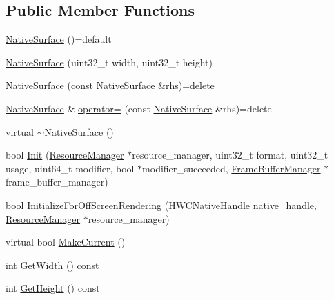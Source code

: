 \subsection*{Public Member Functions}
\begin{DoxyCompactItemize}
\item 
\mbox{\hyperlink{classhwcomposer_1_1NativeSurface_a17e5ae7ecfd166faa21ccba1e6b03197}{Native\+Surface}} ()=default
\item 
\mbox{\hyperlink{classhwcomposer_1_1NativeSurface_a9027ed717fedb2d2f99bc42c6bb82b70}{Native\+Surface}} (uint32\+\_\+t width, uint32\+\_\+t height)
\item 
\mbox{\hyperlink{classhwcomposer_1_1NativeSurface_a92d9adc1ade0f86e5a37a55658e2fbaa}{Native\+Surface}} (const \mbox{\hyperlink{classhwcomposer_1_1NativeSurface}{Native\+Surface}} \&rhs)=delete
\item 
\mbox{\hyperlink{classhwcomposer_1_1NativeSurface}{Native\+Surface}} \& \mbox{\hyperlink{classhwcomposer_1_1NativeSurface_ad293b1c21e9bc452744cde6595227433}{operator=}} (const \mbox{\hyperlink{classhwcomposer_1_1NativeSurface}{Native\+Surface}} \&rhs)=delete
\item 
virtual \mbox{\hyperlink{classhwcomposer_1_1NativeSurface_aedd0dc3037e1291937656921c97dd1a6}{$\sim$\+Native\+Surface}} ()
\item 
bool \mbox{\hyperlink{classhwcomposer_1_1NativeSurface_a6e70cd7f3a013619235dd05934c33930}{Init}} (\mbox{\hyperlink{classhwcomposer_1_1ResourceManager}{Resource\+Manager}} $\ast$resource\+\_\+manager, uint32\+\_\+t format, uint32\+\_\+t usage, uint64\+\_\+t modifier, bool $\ast$modifier\+\_\+succeeded, \mbox{\hyperlink{classhwcomposer_1_1FrameBufferManager}{Frame\+Buffer\+Manager}} $\ast$frame\+\_\+buffer\+\_\+manager)
\item 
bool \mbox{\hyperlink{classhwcomposer_1_1NativeSurface_a1fcece06f9889170f33b3b6a028e149e}{Initialize\+For\+Off\+Screen\+Rendering}} (\mbox{\hyperlink{alios_2platformdefines_8h_ac0a2eaf260f556d17fe489911f017bdf}{H\+W\+C\+Native\+Handle}} native\+\_\+handle, \mbox{\hyperlink{classhwcomposer_1_1ResourceManager}{Resource\+Manager}} $\ast$resource\+\_\+manager)
\item 
virtual bool \mbox{\hyperlink{classhwcomposer_1_1NativeSurface_a2e3bdea36f4b2d3f655a5f6d38670d51}{Make\+Current}} ()
\item 
int \mbox{\hyperlink{classhwcomposer_1_1NativeSurface_ad5004373efe783622a47ba9203d9fdcc}{Get\+Width}} () const
\item 
int \mbox{\hyperlink{classhwcomposer_1_1NativeSurface_a0c3d4c50d2ca532db49ee4214778b264}{Get\+Height}} () const

\end{DoxyCompactItemize}
